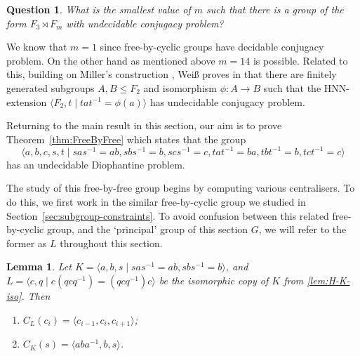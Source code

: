 \documentclass[11pt]{amsart}
\newtheorem{lem}[theorem]{Lemma}
\newtheorem{qu}[theorem]{Question}
\theoremstyle{definition}
\numberwithin{theorem}{section}
\begin{document}
\begin{qu} What is the smallest value of $m$ such that there is a group of the form $F_3 \rtimes F_m$ with undecidable conjugacy problem? \end{qu}

We know that $m=1$ since free-by-cyclic groups have decidable conjugacy problem. On the other hand as mentioned above $m=14$ is possible. 
Related to this, building on Miller's construction \cite{MillerBook}, Wei{\ss} proves in \cite[Theorem 5.8]{WeissThesis} that there are finitely generated subgroups $A, B \leq F_2$ and isomorphism $\phi:A \rightarrow B$ such that the HNN-extension $\langle F_2, t \mid tat^{-1} = \phi(a) \rangle$ has undecidable conjugacy problem.  

Returning to the main result in this section, our aim is to prove Theorem~\ref{thm:FreeByFree} which states that the group  
\[
\langle a, b,c, s, t \mid sas^{-1} = ab, sbs^{-1} = b, scs^{-1} = c, tat^{-1} = ba, tbt^{-1} = b, tct^{-1} = c \rangle
\]
has an undecidable Diophantine problem.

  The study of this free-by-free group begins by computing various
  centralisers. To do this, we first work in the similar free-by-cyclic
  group we studied in Section~\ref{sec:subgroup-constraints}. To avoid
  confusion between this related free-by-cyclic group, and the `principal'
  group of this section \(G\), we will refer to the former as \(L\)
  throughout this section.

\begin{lem} 
    \label{Bob-gp-cent}
	Let \(K = \langle a, b, s \mid sas^{-1} = ab, sbs^{-1} = b \rangle\), and
	\(L = \langle c, q \mid c(qcq^{-1}) = (qcq^{-1})c \rangle\) be the isomorphic copy
	of \(K\) from \cref{lem:H-K-iso}. Then
    \begin{enumerate}
       \item \(C_L(c_i) = \langle c_{i - 1}, c_i, c_{i + 1} \rangle\);
       \label{item:H-cent-ci}
       \item \(C_K(s) = \langle aba^{-1}, b, s \rangle\).
       \label{item:L-cent-r}
    \end{enumerate}
  \end{lem}
\end{document}
